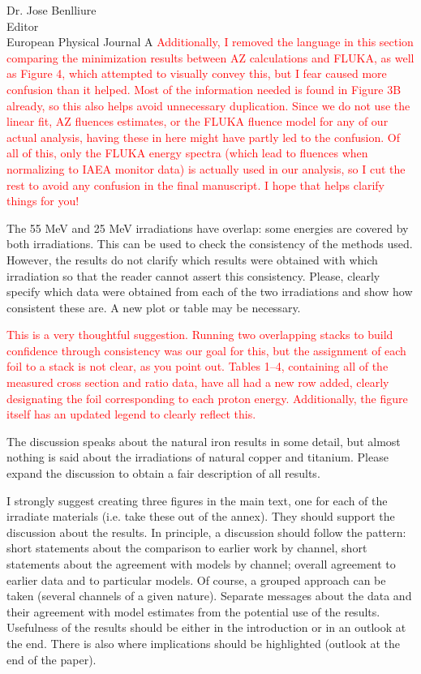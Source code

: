 \documentclass{letter} %
\newcommand{\colornote}[1]{\textcolor{red}{#1}}
\begin{document}
\begin{letter}{Dr. Jose Benlliure \\
Editor \\
European Physical Journal A}
\colornote{Additionally, I removed the language in this section comparing the minimization results between AZ calculations and FLUKA, as well as Figure 4, which attempted to visually convey this, but I fear caused more confusion than it helped.  Most of the information needed is found in Figure 3B already, so this also helps avoid unnecessary duplication. Since we do not use the linear fit, AZ fluences estimates, or the FLUKA fluence model for any of our actual analysis,  having these in here might have partly led to the confusion.  Of all of this, only the FLUKA energy spectra (which lead to fluences when normalizing to IAEA monitor data) is actually used in our analysis, so I cut the rest to avoid any confusion in the final manuscript.  I hope that helps clarify things for you!}


The 55 MeV and 25 MeV irradiations have overlap: some energies are covered by both irradiations. This can be used to check the consistency of the methods used. However, the results do not clarify which results were obtained with which irradiation so that the reader cannot assert this consistency. Please, clearly specify which data were obtained from each of the two irradiations and show how consistent these are. A new plot or table may be necessary.

\colornote{This is a  very thoughtful suggestion. Running two overlapping stacks to build confidence through consistency was our goal for this, but the assignment of each foil to a stack is not clear, as you point out.  Tables 1--4, containing all of the measured cross section and ratio data, have all had a new row added, clearly designating the foil corresponding to each proton energy. Additionally, the figure itself has an updated legend to clearly reflect this.}

The discussion speaks about the natural iron results in some detail, but almost nothing is said about the irradiations of natural copper and titanium. Please expand the discussion to obtain a fair description of all results.

I strongly suggest creating three figures in the main text, one for each of the irradiate materials (i.e. take these out of the annex). They should support the discussion about the results. In principle, a discussion should follow the pattern: short statements about the comparison to earlier work by channel, short statements about the agreement with models by channel; overall agreement to earlier data and to particular models. Of course, a grouped approach can be taken (several channels of a given nature). Separate messages about the data and their agreement with model estimates from the potential use of the results. Usefulness of the results should be either in the introduction or in an outlook at the end. There is also where implications should be highlighted (outlook at the end of the paper).




\end{letter}
\end{document}
